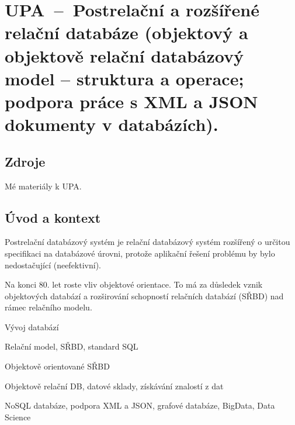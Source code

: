 

\graphicspath{{upa/postrelacni_a_rozsirene_relacni/figures}}


\chapter{UPA~--~Postrelační a rozšířené relační databáze (objektový a objektově relační databázový model -- struktura a operace; podpora práce s XML a JSON dokumenty v databázích).}


\section{Zdroje}

\begin{compactitem}
    \item {}
    \item {}
    \item {}
    \item {}
    \item {}
    \item Mé materiály k UPA.
\end{compactitem}


\section{Úvod a kontext}

\begin{compactitem}
    \item Postrelační databázový systém je relační databázový systém rozšířený o určitou specifikaci na databázové úrovni, protože aplikační řešení problému by bylo nedostačující (neefektivní). \begin{compactitem}
        \item Na konci 80. let roste vliv objektové orientace. To má za důsledek vznik objektových databází a rozširování schopností relačních databází (SŘBD) nad rámec relačního modelu.
    \end{compactitem}
    \item Vývoj databází
    \item Relační model, SŘBD, standard SQL
    \item Objektově orientované SŘBD
    \item Objektově relační DB, datové sklady, získávání znalostí z dat
    \item NoSQL databáze, podpora XML a JSON, grafové databáze, BigData, Data Science
\end{compactitem}

